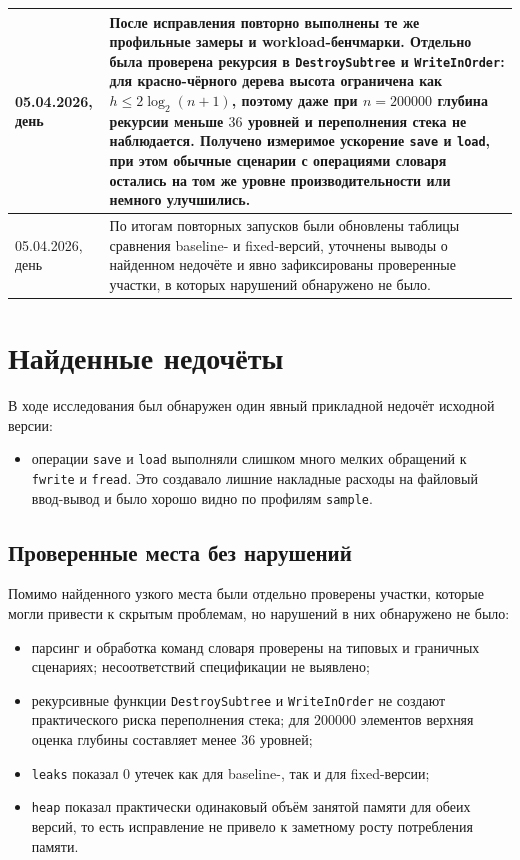 \begin{longtable}{|p{}|p{}|}
05.04.2026, день &
После исправления повторно выполнены те же профильные замеры и workload-бенчмарки. Отдельно была проверена рекурсия в \texttt{DestroySubtree} и \texttt{WriteInOrder}: для красно-чёрного дерева высота ограничена как \(h \leq 2 \log_2(n + 1)\), поэтому даже при \(n = 200000\) глубина рекурсии меньше \(36\) уровней и переполнения стека не наблюдается. Получено измеримое ускорение \texttt{save} и \texttt{load}, при этом обычные сценарии с операциями словаря остались на том же уровне производительности или немного улучшились. \\
\hline

05.04.2026, день &
По итогам повторных запусков были обновлены таблицы сравнения baseline- и fixed-версий, уточнены выводы о найденном недочёте и явно зафиксированы проверенные участки, в которых нарушений обнаружено не было. \\
\hline
\end{longtable}

\section{Найденные недочёты}

В ходе исследования был обнаружен один явный прикладной недочёт исходной версии:
\begin{itemize}
\item операции \texttt{save} и \texttt{load} выполняли слишком много мелких обращений к \texttt{fwrite} и \texttt{fread}. Это создавало лишние накладные расходы на файловый ввод-вывод и было хорошо видно по профилям \texttt{sample}.
\end{itemize}

\subsection*{Проверенные места без нарушений}

Помимо найденного узкого места были отдельно проверены участки, которые могли привести к скрытым проблемам, но нарушений в них обнаружено не было:
\begin{itemize}
\item парсинг и обработка команд словаря проверены на типовых и граничных сценариях; несоответствий спецификации не выявлено;
\item рекурсивные функции \texttt{DestroySubtree} и \texttt{WriteInOrder} не создают практического риска переполнения стека; для \(200000\) элементов верхняя оценка глубины составляет менее \(36\) уровней;
\item \texttt{leaks} показал \(0\) утечек как для baseline-, так и для fixed-версии;
\item \texttt{heap} показал практически одинаковый объём занятой памяти для обеих версий, то есть исправление не привело к заметному росту потребления памяти.
\end{itemize}

